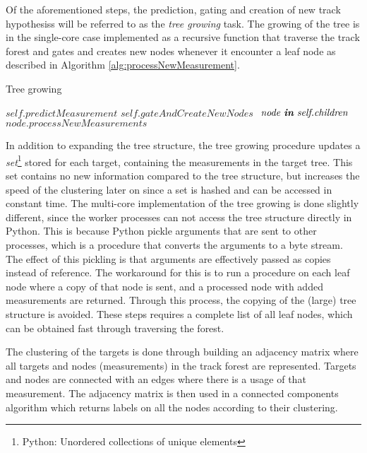 Of the aforementioned steps, the prediction, gating and creation of new \glspl{track hypothesis} will be referred to as the \emph{tree growing} task. The growing of the tree is in the single-core case implemented as a recursive function that traverse the track forest and gates and creates new nodes whenever it encounter a leaf node as described in Algorithm \ref{alg:processNewMeasurement}.
\begin{algorithm}[H]
\caption{Tree growing}
\label{alg:processNewMeasurement}
\begin{algorithmic}[1]
	\State $\textit{self.predictMeasurement}$
	\State $\textit{self.gateAndCreateNewNodes}$
\Else
	\For $ \textit{ node \textbf{in} self.children} $
		\State $\textit{node.processNewMeasurements}$
	\EndFor
\EndIf
\EndProcedure
\end{algorithmic}
\end{algorithm}
In addition to expanding the tree structure, the tree growing procedure updates a \emph{set}\footnote{Python: Unordered collections of unique elements} stored for each target, containing the measurements in the target tree. This set contains no new information compared to the tree structure, but increases the speed of the clustering later on since a set is hashed and can be accessed in constant time. The multi-core implementation of the tree growing is done slightly different, since the worker processes can not access the tree structure directly in Python. This is because Python pickle arguments that are sent to other processes, which is a procedure that converts the arguments to a byte stream. The effect  of this pickling is that arguments are effectively passed as copies instead of reference. The workaround for this is to run a procedure on each leaf node where a copy of that node is sent, and a processed node with added measurements are returned. Through this process, the copying of the (large) tree structure  is avoided. These steps requires a complete list of all leaf nodes, which can be obtained fast through traversing the forest.

The clustering of the targets is done through building an adjacency matrix where all targets and nodes (measurements) in the track forest are represented. Targets and nodes are connected with an edges where there is a usage of that measurement. The adjacency matrix is then used in a connected components algorithm which returns labels on all the nodes according to their clustering.

